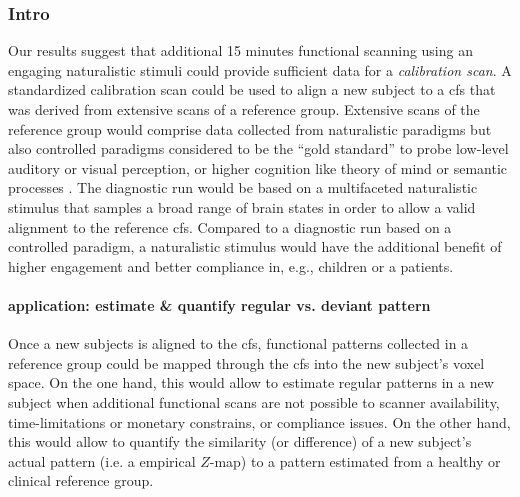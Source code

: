 


\subsubsection{Intro}



%
Our results suggest that additional 15 minutes functional scanning using an
engaging naturalistic stimuli could provide sufficient data for a
\textit{calibration scan}.
%
A standardized calibration scan could be used to align a new subject to a
\ac{cfs} that was derived from extensive scans of a reference group.
%
Extensive scans of the reference group would comprise data collected from
naturalistic paradigms but also controlled paradigms considered to be the ``gold
standard'' to probe low-level auditory or visual perception, or higher cognition
like theory of mind \citep{spunt2014validating} or semantic processes
\citep{fedorenko2010new, fernandez2001language}.
%
The diagnostic run would be based on a multifaceted naturalistic stimulus that
samples a broad range of brain states in order to allow a valid alignment to the
reference \ac{cfs}.
%
Compared to a diagnostic run based on a controlled paradigm, a naturalistic
stimulus would have the additional benefit of higher engagement and better
compliance \citep{vanderwal2015inscapes, eickhoff2020towards} in, e.g., children
or a patients.


\paragraph{application: estimate \& quantify regular vs. deviant pattern}

%
Once a new subjects is aligned to the \ac{cfs}, functional patterns collected in
a reference group could be mapped through the \ac{cfs} into the new subject's
voxel space.
%
On the one hand, this would allow to estimate regular patterns in a new subject
when additional functional scans are not possible to scanner availability,
time-limitations or monetary constrains, or compliance issues.
%
On the other hand, this would allow to quantify the similarity (or difference)
of a new subject's actual pattern (i.e. a empirical $Z$-map) to a pattern
estimated from a healthy or clinical reference group.


